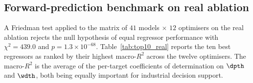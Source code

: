 %


\subsection{Forward-prediction benchmark on real ablation}\label{sec:results:benchmark}

A Friedman test applied to the matrix of $41$ models $\times$ $12$ optimisers on the real ablation rejects the null hypothesis of equal regressor performance with $\chi^{2} = 439.0$ and $p = 1.3 \times 10^{-68}$. Table~\ref{tab:top10_real} reports the ten best regressors as ranked by their highest macro-$R^{2}$ across the twelve optimisers. The macro-$R^{2}$ is the average of the per-target coefficients of determination on $\dpth$ and $\wdth$, both being equally important for industrial decision support.

